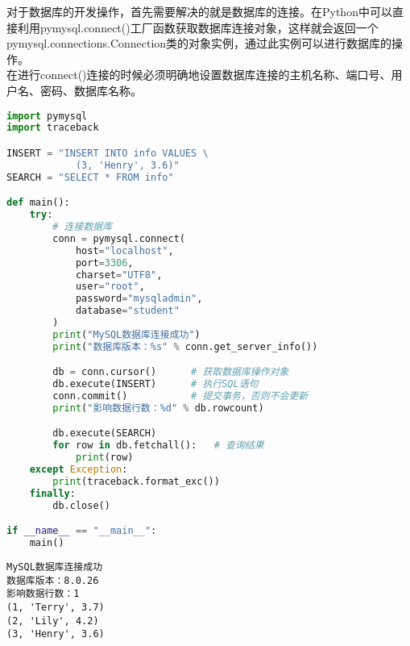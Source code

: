 对于数据库的开发操作，首先需要解决的就是数据库的连接。在Python中可以直接利用pymysql.connect()工厂函数获取数据库连接对象，这样就会返回一个pymysql.connections.Connection类的对象实例，通过此实例可以进行数据库的操作。\\

在进行connect()连接的时候必须明确地设置数据库连接的主机名称、端口号、用户名、密码、数据库名称。\\


\begin{lstlisting}[language=Python]
import pymysql
import traceback

INSERT = "INSERT INTO info VALUES \
            (3, 'Henry', 3.6)"
SEARCH = "SELECT * FROM info"

def main():
    try:
        # 连接数据库
        conn = pymysql.connect(
            host="localhost",
            port=3306,
            charset="UTF8",
            user="root",
            password="mysqladmin",
            database="student"
        )
        print("MySQL数据库连接成功")
        print("数据库版本：%s" % conn.get_server_info())

        db = conn.cursor()      # 获取数据库操作对象
        db.execute(INSERT)      # 执行SQL语句
        conn.commit()           # 提交事务，否则不会更新
        print("影响数据行数：%d" % db.rowcount)

        db.execute(SEARCH)
        for row in db.fetchall():   # 查询结果
            print(row)
    except Exception:
        print(traceback.format_exc())
    finally:
        db.close()

if __name__ == "__main__":
    main()
\end{lstlisting}

\begin{tcolorbox}
	\begin{verbatim}
MySQL数据库连接成功
数据库版本：8.0.26
影响数据行数：1
(1, 'Terry', 3.7)
(2, 'Lily', 4.2)
(3, 'Henry', 3.6)
\end{verbatim}
\end{tcolorbox}

\newpage